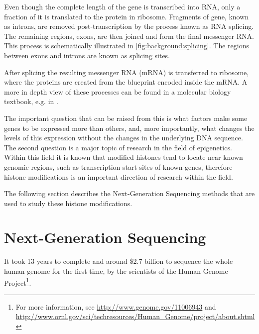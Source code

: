 \documentclass[parskip]{cs4rep}
\begin{document}
Even though the complete length of the gene is transcribed into RNA, only a fraction of it is translated to the protein in ribosome. Fragments of gene, known as introns, are removed post-transcription by the process known as RNA splicing. The remaining regions, exons, are then joined and form the final messenger RNA. This process is schematically illustrated in \autoref{fig:background:splicing}. The regions between exons and introns are known as splicing sites. 

After splicing the resulting messenger RNA (mRNA) is transferred to ribosome, where the proteins are created from the blueprint encoded inside the mRNA. A more in depth view of these processes can be found in a molecular biology textbook, e.g. in \cite{Alberts:2002vj,Alberts:2002wf}.

The important question that can be raised from this is what factors make some genes to be expressed more than others, and, more importantly, what changes the levels of this expression without the changes  in the underlying DNA sequence. The second question is a major topic of research in the field of epigenetics. Within this field it is known that modified histones tend to locate near known genomic regions, such as transcription start sites of known genes\cite{Pokholok:2005wn,Kouzarides:2007js}, therefore histone modifications is an important direction of research within the field.

The following section describes the Next-Generation Sequencing methods that are used to study these
histone modifications.
 
\section{Next-Generation Sequencing}

It took 13 years to complete and around \$2.7 billion to sequence the whole human genome for the first time, by the scientists of the Human Genome Project\footnote{For more information, see \url{http://www.genome.gov/11006943} and
    \url{http://www.ornl.gov/sci/techresources/Human_Genome/project/about.shtml}}. 
    
\end{document}
